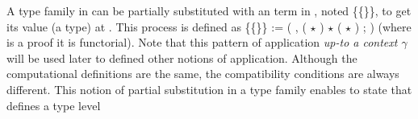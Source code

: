   A type family  in   can be partially substituted with an
  term  in  , noted  \{\{\}\}, to get its value (a type) at
  . This process is defined as  \{\{\}\} := (\coqdocvar{\ensuremath{\lambda}} \coqdocvariable{$\gamma$}, ( $\star$ \coqdocvariable{$\gamma$}) $\star$ ( $\star$ \coqdocvariable{$\gamma$}) ;
  \coqdocvar{\_}) (where \coqdocvar{\_} is a proof it is functorial). Note that this
  pattern of application \emph{up-to a context $\gamma$} will be used
  later to defined other notions of application. Although the
  computational definitions are the same, the compatibility conditions
  are always different.  This notion of partial substitution in a type
  family enables to state that  defines a type level
